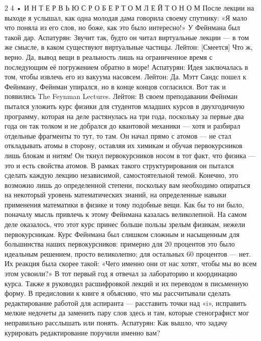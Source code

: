 \documentclass[10pt,oneside]{article}
\begin{document}
2 4 • И Н Т Е Р В Ь Ю  С  Р О Б Е Р Т О М  Л Е Й Т О Н О М После лекции на выходе я услышал, как одна молодая дама говорила своему спутнику: «Я мало что поняла из его слов, но боже, как это было интересно!» У Фейнмана был такой дар. Аспатурян: Звучит так, будто он читал виртуальные лекции --- в том же смысле, в каком существуют виртуальные частицы. Лейтон: [Смеется] Что ж, верно. Да, вывод вещи в реальность лишь на ограниченное время с последующим её погружением обратно в море! Аспатурян: Идея заключалась в том, чтобы извлечь его из вакуума насовсем. Лейтон: Да. Мэтт Сандс пошел к Фейнману, Фейнман упирался, но в конце концов согласился. Вот так и появились The Feynman Lectures. Лейтон: В своем преподавании Фейнман пытался уложить курс физики для студентов младших курсов в двухгодичную программу, которая на деле растянулась на три года, поскольку за первые два года он так толком и не добрался до квантовой механики --- хотя и разбирал отдельные фрагменты то тут, то там. Он начал прямо с атомов --- не стал откладывать атомы в сторону, оставляя их химикам и обучая первокурсников лишь блокам и нитям! Он ткнул первокурсников носом в тот факт, что физика --- это и есть свойства атомов. В рамках такого структурирования он пытался сделать каждую лекцию независимой, самостоятельной темой. Конечно, это возможно лишь до определенной степени, поскольку вам необходимо опираться на некоторый уровень математических знаний, на определенные навыки применения математики в физике и тому подобные вещи. Как бы то ни было, поначалу мысль привлечь к этому Фейнмана казалась великолепной. На самом деле оказалось, что этот курс принес больше пользы зрелым физикам, нежели первокурсникам. Курс Фейнмана был слишком сложным и насыщенным для большинства наших первокурсников: примерно для 20 процентов это было идеальным решением, просто великолепно; для остальных 60 процентов --- нет. Их реакция была скорее такой: «Чего именно они от нас хотят, чтобы мы во всем этом усвоили?» В тот первый год я отвечал за лабораторию и координацию курса. Также я руководил расшифровкой лекций и их переводом в письменную форму. В предисловии к книге я объясняю, что мы рассчитывали сделать редактирование работой для аспиранта --- расставить точки над «i», исправить мелкие недочеты да заменить пару слов здесь и там, которые стенографист мог неправильно расслышать или понять. Аспатурян: Как вышло, что задачу курировать редактирование поручили именно вам?\par
\end{document}

